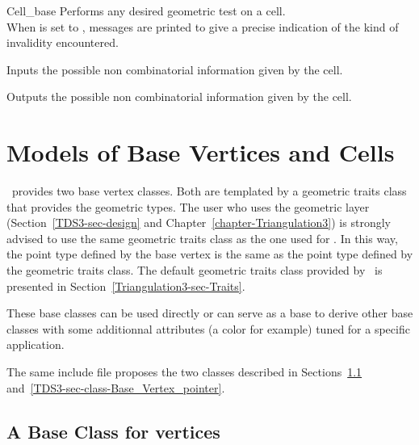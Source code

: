 \begin{ccClass}{Cell_base}
{Performs any desired geometric test on a cell.\\
When  is set to , messages are printed to give
a precise indication of the kind of invalidity encountered.}


{Inputs the possible non combinatorial information given by the cell.
}

{Outputs the possible non combinatorial information given by the cell.
}

	\end{ccClass} 

\section{Models of Base Vertices and Cells}
\label{TDS3-sec-class-Base}

\cgal\ provides two base vertex classes. Both are templated by a
geometric traits class  that provides the geometric
types. The user who uses the geometric layer
(Section~\ref{TDS3-sec-design} and
Chapter~\ref{chapter-Triangulation3}) is strongly advised to use the
same geometric traits class  as the one used for
. In this way, the point type
defined by the base vertex is the same as the point type defined by
the geometric traits class. The default geometric traits class
provided by \cgal\ is presented in
Section~\ref{Triangulation3-sec-Traits}. 

These base classes can be used directly or can serve as a base to derive
other base classes with some additionnal attributes (a color for
example) tuned for a specific application.


The same include file proposes the two classes described in
Sections~\ref{TDS3-sec-class-Base_Vertex} 
and~\ref{TDS3-sec-class-Base_Vertex_pointer}.

	\subsection{A Base Class for vertices}
	\label{TDS3-sec-class-Base_Vertex}


